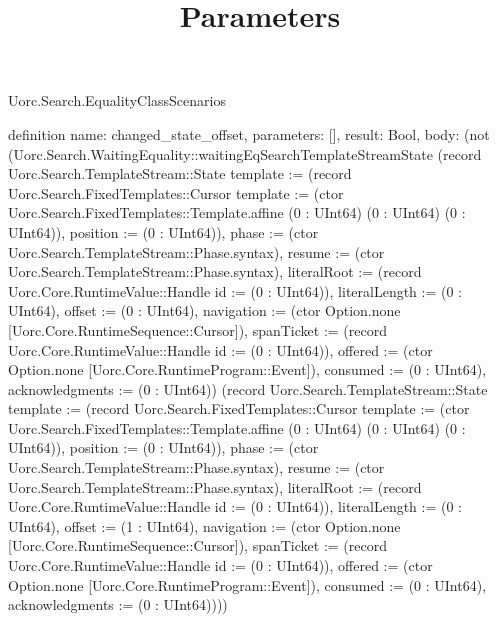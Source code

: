 \begin{lexlean}{Uorc.Search.EqualityClassScenarios}
\title{Parameters}
\begin{semanticmodule}
definition{
  name: changed_state_offset,
  parameters: [],
  result: Bool,
  body: (not (Uorc.Search.WaitingEquality::waitingEqSearchTemplateStreamState (record Uorc.Search.TemplateStream::State {template := (record Uorc.Search.FixedTemplates::Cursor {template := (ctor Uorc.Search.FixedTemplates::Template.affine (0 : UInt64) (0 : UInt64) (0 : UInt64)), position := (0 : UInt64)}), phase := (ctor Uorc.Search.TemplateStream::Phase.syntax), resume := (ctor Uorc.Search.TemplateStream::Phase.syntax), literalRoot := (record Uorc.Core.RuntimeValue::Handle {id := (0 : UInt64)}), literalLength := (0 : UInt64), offset := (0 : UInt64), navigation := (ctor Option.none [Uorc.Core.RuntimeSequence::Cursor]), spanTicket := (record Uorc.Core.RuntimeValue::Handle {id := (0 : UInt64)}), offered := (ctor Option.none [Uorc.Core.RuntimeProgram::Event]), consumed := (0 : UInt64), acknowledgments := (0 : UInt64)}) (record Uorc.Search.TemplateStream::State {template := (record Uorc.Search.FixedTemplates::Cursor {template := (ctor Uorc.Search.FixedTemplates::Template.affine (0 : UInt64) (0 : UInt64) (0 : UInt64)), position := (0 : UInt64)}), phase := (ctor Uorc.Search.TemplateStream::Phase.syntax), resume := (ctor Uorc.Search.TemplateStream::Phase.syntax), literalRoot := (record Uorc.Core.RuntimeValue::Handle {id := (0 : UInt64)}), literalLength := (0 : UInt64), offset := (1 : UInt64), navigation := (ctor Option.none [Uorc.Core.RuntimeSequence::Cursor]), spanTicket := (record Uorc.Core.RuntimeValue::Handle {id := (0 : UInt64)}), offered := (ctor Option.none [Uorc.Core.RuntimeProgram::Event]), consumed := (0 : UInt64), acknowledgments := (0 : UInt64)})))
}


\end{semanticmodule}
\end{lexlean}
